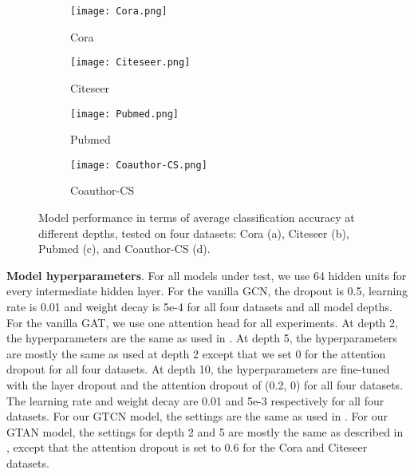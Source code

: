\documentclass[lettersize,journal]{IEEEtran}
\theoremstyle{plain}
\theoremstyle{definition}
\theoremstyle{remark}
\begin{document}
\begin{figure}[ht]
	\begin{subfigure}[b]{0.235\textwidth}
		\begin{center}
			\texttt{[image: Cora.png]}
			\caption{Cora}
			\label{fig:depth_cora}
		\end{center}
	\end{subfigure}
	\begin{subfigure}[b]{0.235\textwidth}
		\begin{center}
			\texttt{[image: Citeseer.png]}
			\caption{Citeseer}
			\label{fig:depth_citeseer}
		\end{center}
	\end{subfigure}
	\newline
	\begin{subfigure}[b]{0.235\textwidth}
		\begin{center}
			\texttt{[image: Pubmed.png]}
			\caption{Pubmed}
			\label{fig:depth_pubmed}
		\end{center}
	\end{subfigure}
	\begin{subfigure}[b]{0.235\textwidth}
		\begin{center}
			\texttt{[image: Coauthor-CS.png]}
			\caption{Coauthor-CS}
			\label{fig:depth_coauthor}
		\end{center}
	\end{subfigure}
	\caption{Model performance in terms of average classification accuracy at different depths, tested on four datasets: Cora (a), Citeseer (b), Pubmed (c), and Coauthor-CS (d).}
	\label{fig:depth}
\end{figure}

\textbf{Model hyperparameters}. For all models under test, we use 64 hidden units for every intermediate hidden layer. For the vanilla GCN, the dropout is 0.5, learning rate is 0.01 and weight decay is 5e-4 for all four datasets and all model depths. For the vanilla GAT, we use one attention head for all experiments. At depth 2, the hyperparameters are the same as used in . At depth 5, the hyperparameters are mostly the same as used at depth 2 except that we set 0 for the attention dropout for all four datasets. At depth 10, the hyperparameters are fine-tuned with the layer dropout and the attention dropout of (0.2, 0) for all four datasets. The learning rate and weight decay are 0.01 and 5e-3 respectively for all four datasets. For our GTCN model, the settings are the same as used in . For our GTAN model, the settings for depth 2 and 5 are mostly the same as described in , except that the attention dropout is set to 0.6 for the Cora and Citeseer datasets.
\end{document}
